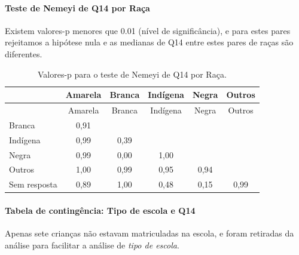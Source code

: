 \documentclass[]{article}
\let\oldparagraph\paragraph
\renewcommand{\paragraph}[1]{\oldparagraph{#1}\mbox{}}
\begin{document}
\hypertarget{teste-de-nemeyi-de-q14-por-rauxe7a}{%
\paragraph{Teste de Nemeyi de Q14 por Raça}\label{teste-de-nemeyi-de-q14-por-rauxe7a}}

Existem valores-p menores que 0.01 (nível de significância), e para estes pares rejeitamos a hipótese nula e as medianas de Q14 entre estes pares de raças são diferentes.

\begin{longtable}[]{@{}lccccc@{}}
\caption{\label{tab:unnamed-chunk-52}Valores-p para o teste de Nemeyi de Q14 por Raça.}\tabularnewline
\toprule
& Amarela & Branca & Indígena & Negra & Outros\tabularnewline
\midrule
\endfirsthead
\toprule
& Amarela & Branca & Indígena & Negra & Outros\tabularnewline
\midrule
\endhead
Branca & 0,91 & & & &\tabularnewline
Indígena & 0,99 & 0,39 & & &\tabularnewline
Negra & 0,99 & 0,00 & 1,00 & &\tabularnewline
Outros & 1,00 & 0,99 & 0,95 & 0,94 &\tabularnewline
Sem resposta & 0,89 & 1,00 & 0,48 & 0,15 & 0,99\tabularnewline
\bottomrule
\end{longtable}

\cleardoublepage

\hypertarget{tabela-de-continguxeancia-tipo-de-escola-e-q14}{%
\paragraph{Tabela de contingência: Tipo de escola e Q14}\label{tabela-de-continguxeancia-tipo-de-escola-e-q14}}

Apenas sete crianças não estavam matriculadas na escola, e foram retiradas da análise para facilitar a análise de \emph{tipo de escola}.
\end{document}
